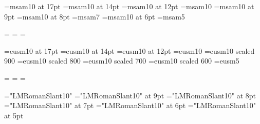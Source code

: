 %

\font\seventeenmsa=msam10 at 17pt   
\font\fourteenmsa=msam10 at 14pt
\font\twelvemsa=msam10 at 12pt
\font\tenmsa=msam10
\font\ninemsa=msam10 at 9pt
\font\eightmsa=msam10 at 8pt
\font\sevenmsa=msam7
\font\sixmsa=msam10 at 6pt
\font\fivemsa=msam5

\newfam\msafam
\textfont\msafam=\tenmsa
\scriptfont\msafam=\sevenmsa
\scriptscriptfont\msafam=\fivemsa


\font\seventeenscaln=eusm10 at 17pt
\font\fourteenscaln=eusm10 at 14pt
\font\twelvescaln=eusm10 at 12pt
\font\tenscaln=eusm10
\font\ninescaln=eusm10 scaled 900
\font\eightscaln=eusm10 scaled 800
\font\sevenscaln=eusm10 scaled 700
\font\sixscaln=eusm10 scaled 600
\font\fivescaln=eusm5

\newfam\scalnfam
\textfont\scalnfam=\tenscaln
\scriptfont\scalnfam=\sevenscaln
\scriptscriptfont\scalnfam=\fivescaln

\def\scal{\fam\scalnfam\tenscaln}

% 
\font\tensl="LMRomanSlant10"%
\font\ninesl="LMRomanSlant10" at 9pt%
\font\eightsl="LMRomanSlant10" at 8pt%
\font\sevensl="LMRomanSlant10" at 7pt%
\font\sixsl="LMRomanSlant10" at 6pt%
\font\fivesl="LMRomanSlant10" at 5pt%



% 


